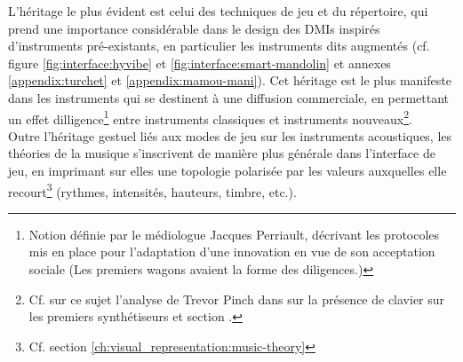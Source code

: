  \noindent L'héritage le plus évident est celui des techniques de jeu et du répertoire, qui prend une importance considérable dans le design des \glspl{DMI} inspirés d'instruments pré-existants, en particulier les instruments dits augmentés (cf. figure \ref{fig:interface:hyvibe} et \ref{fig:interface:smart-mandolin} et annexes \ref{appendix:turchet} et \ref{appendix:mamou-mani}). Cet héritage est le plus manifeste dans les instruments qui se destinent à une diffusion commerciale, en permettant un effet dilligence\footnote{Notion définie par le médiologue Jacques Perriault, décrivant les protocoles mis en place pour l'adaptation d'une innovation en vue de son acceptation sociale (Les premiers wagons avaient la forme des diligences.)} entre instruments classiques et instruments nouveaux\footnote{\label{fn:Pinch}Cf. sur ce sujet l'analyse de Trevor Pinch dans \cite{pinch_why_2001} sur la présence de clavier sur les premiers synthétiseurs et section \label{sec:visual_representation:visual_aspects:adaptation_to_sound}.}.\\
 \indent Outre l'héritage gestuel liés aux modes de jeu sur les instruments acoustiques, les théories de la musique s'inscrivent de manière plus générale dans l'interface de jeu, en imprimant sur elles une topologie polarisée par les valeurs auxquelles elle recourt\footnote{Cf. section \ref{ch:visual_representation:music-theory}} (rythmes, intensités, hauteurs, timbre, etc.).


